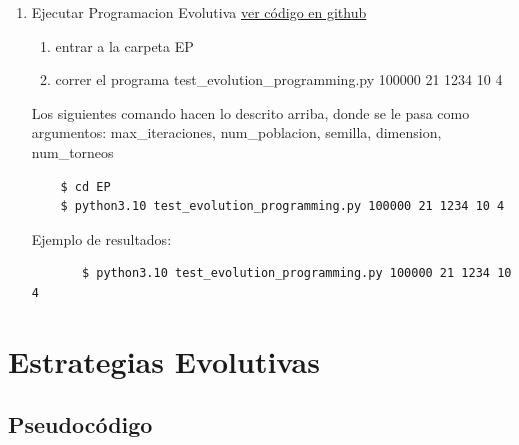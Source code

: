 \documentclass{article}
\begin{document}
\begin{enumerate} 
\item Ejecutar Programacion Evolutiva
  \href{https://github.com/luisballado/InteligenciaComputacional/tree/master/code/tarea1/EP}{ver código en github}\\
  \begin{enumerate}
  \item entrar a la carpeta EP
  \item correr el programa test\_evolution\_programming.py 100000 21 1234 10 4
  \end{enumerate} 
  
  Los siguientes comando hacen lo descrito arriba, donde se le pasa como argumentos: max_iteraciones, num_poblacion, semilla, dimension, num_torneos
  
  \begin{commandline}
     \begin{verbatim}
    $ cd EP       
    $ python3.10 test_evolution_programming.py 100000 21 1234 10 4
     \end{verbatim}
  \end{commandline}
  
  Ejemplo de resultados:
  
  \begin{commandline}
     \begin{verbatim}
       $ python3.10 test_evolution_programming.py 100000 21 1234 10 4
     \end{verbatim}
  \end{commandline}
  
\end{enumerate} 


\newpage
\section{Estrategias Evolutivas}
\subsection{Pseudocódigo}
\end{document}
